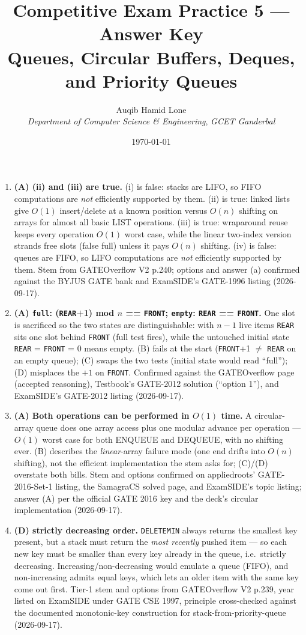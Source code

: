 \documentclass[11pt]{article}
\title{Competitive Exam Practice 5 --- Answer Key\\\large Queues, Circular Buffers, Deques, and Priority Queues}
\author{Auqib Hamid Lone\\[0.3em]
  \emph{Department of Computer Science \& Engineering}, \emph{GCET Ganderbal}}
\date{\today}
\begin{document}
\maketitle

\begin{enumerate}
\item[\textbf{Q1}] \textbf{(A) (ii) and (iii) are true.} (i) is false: stacks are LIFO, so FIFO computations are \emph{not} efficiently supported by them. (ii) is true: linked lists give $O(1)$ insert/delete at a known position versus $O(n)$ shifting on arrays for almost all basic LIST operations. (iii) is true: wraparound reuse keeps every operation $O(1)$ worst case, while the linear two-index version strands free slots (false full) unless it pays $O(n)$ shifting. (iv) is false: queues are FIFO, so LIFO computations are \emph{not} efficiently supported by them. Stem from GATEOverflow V2 p.240; options and answer (a) confirmed against the BYJUS GATE bank and ExamSIDE's GATE-1996 listing (2026-09-17).

\item[\textbf{Q2}] \textbf{(A) \texttt{full}: (\texttt{REAR}+1) mod $n$ == \texttt{FRONT}; \texttt{empty}: \texttt{REAR} == \texttt{FRONT}.} One slot is sacrificed so the two states are distinguishable: with $n-1$ live items \texttt{REAR} sits one slot behind \texttt{FRONT} (full test fires), while the untouched initial state \texttt{REAR} = \texttt{FRONT} = 0 means empty. (B) fails at the start (\texttt{FRONT}+1 $\ne$ \texttt{REAR} on an empty queue); (C) swaps the two tests (initial state would read ``full''); (D) misplaces the $+1$ on \texttt{FRONT}. Confirmed against the GATEOverflow page (accepted reasoning), Testbook's GATE-2012 solution (``option 1''), and ExamSIDE's GATE-2012 listing (2026-09-17).

\item[\textbf{Q3}] \textbf{(A) Both operations can be performed in $O(1)$ time.} A circular-array queue does one array access plus one modular advance per operation --- $O(1)$ worst case for both ENQUEUE and DEQUEUE, with no shifting ever. (B) describes the \emph{linear}-array failure mode (one end drifts into $O(n)$ shifting), not the efficient implementation the stem asks for; (C)/(D) overstate both bills. Stem and options confirmed on appliedroots' GATE-2016-Set-1 listing, the SamagraCS solved page, and ExamSIDE's topic listing; answer (A) per the official GATE 2016 key and the deck's circular implementation (2026-09-17).

\item[\textbf{Q4}] \textbf{(D) strictly decreasing order.} \texttt{DELETEMIN} always returns the smallest key present, but a stack must return the \emph{most recently} pushed item --- so each new key must be smaller than every key already in the queue, i.e.\ strictly decreasing. Increasing/non-decreasing would emulate a queue (FIFO), and non-increasing admits equal keys, which lets an older item with the same key come out first. Tier-1 stem and options from GATEOverflow V2 p.239, year listed on ExamSIDE under GATE CSE 1997, principle cross-checked against the documented monotonic-key construction for stack-from-priority-queue (2026-09-17).


\end{enumerate}
\end{document}
